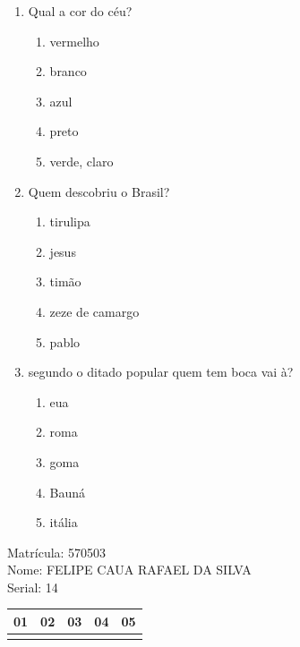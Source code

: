 \documentclass[10pt,a4paper,twocolumn]{report}
\begin{document}
 \begin{enumerate} 
    \item  Qual a cor do céu?





    \begin{enumerate}
    \item  vermelho

\item  branco

\item  azul

\item  preto

\item  verde, claro


    \end{enumerate} 
    \item  Quem descobriu o Brasil?





    \begin{enumerate}
    \item  tirulipa

\item  jesus

\item  timão

\item  zeze de camargo

\item  pablo


    \end{enumerate} 
    \item  segundo o ditado popular quem tem boca vai à?





    \begin{enumerate}
    \item  eua

\item  roma

\item  goma

\item  Bauná

\item  itália


    \end{enumerate}\end{enumerate} 
Matrícula: 570503\\ Nome: FELIPE CAUA RAFAEL DA SILVA \\ Serial: 14\\
\begin{tabular}{|l|l|l|l|l|}\hline
01  &02  &03  &04  &05 \\ \hline 
 & & & & \\ \hline 
\end{tabular}
 \cleardoublepage 
\end{document}

